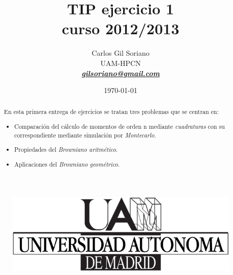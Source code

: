 \documentclass[a4paper,11pt]{article}
\begin{document}

\title{\textbf{{\LARGE TIP ejercicio 1 \\ curso 2012/2013}}}
\author{Carlos Gil Soriano\\UAM-HPCN\\
\href{mailto:gilsoriano@gmail.com}{\textbf{\textit{gilsoriano@gmail.com}}}}
\date{\today}
\maketitle
\thispagestyle{empty}
\begin{figure}[htb]
   \begin{center}
      \includegraphics[scale=1,
      keepaspectratio]{../../../../../figures/logo/logo-uam.jpg}
   \end{center}
\end{figure}

\begin{abstract}

   En esta primera entrega de ejercicios se tratan tres problemas que se centran
   en:
   \begin{itemize}
      \item Comparaci\'on del c\'alculo de momentos de orden n mediante
         \textit{cuadraturas} con su correspondiente mediante simulaci\'on por
         \textit{Montecarlo}.
      \item Propiedades del \textit{Browniano aritm\'etico}.
      \item Aplicaciones del \textit{Browniano geom\'etrico}.
   \end{itemize}

\end{abstract}
\end{document}
